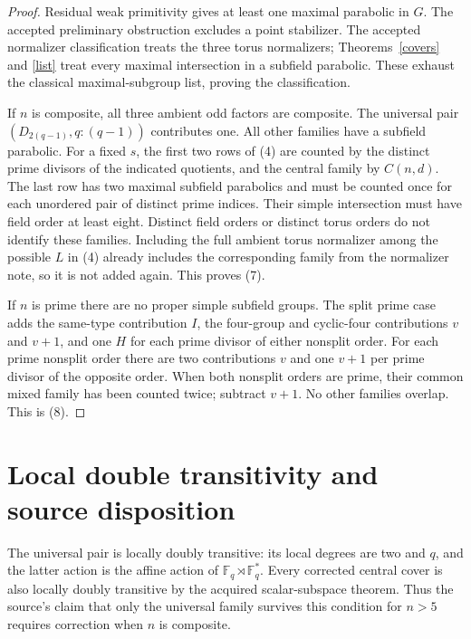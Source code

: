 \documentclass[11pt,a4paper]{article}
\newcommand{\F}{\mathbb F}
\begin{document}
\begin{proof}
Residual weak primitivity gives at least one maximal parabolic
in $G$. The accepted preliminary obstruction excludes a point
stabilizer. The accepted normalizer classification treats the
three torus normalizers; Theorems~\ref{covers} and \ref{list}
treat every maximal intersection in a subfield parabolic.
These exhaust the classical maximal-subgroup list, proving the
classification.

If $n$ is composite, all three ambient odd factors are composite.
The universal pair $(D_{2(q-1)},q\!:\!(q-1))$ contributes one.
All other families have a subfield parabolic. For a fixed $s$,
the first two rows of (4) are counted by the distinct prime
divisors of the indicated quotients, and the central family by
$C(n,d)$. The last row has two maximal subfield parabolics and
must be counted once for each unordered pair of distinct prime
indices. Their simple intersection must have field order at
least eight. Distinct field orders or distinct torus orders do
not identify these families. Including the full ambient torus
normalizer among the possible $L$ in (4) already includes the
corresponding family from the normalizer note, so it is not
added again. This proves (7).

If $n$ is prime there are no proper simple subfield groups.
The split prime case adds the same-type contribution $I$,
the four-group and cyclic-four contributions $v$ and $v+1$,
and one $H$ for each prime divisor of either nonsplit order.
For each prime nonsplit order there are two contributions $v$
and one $v+1$ per prime divisor of the opposite order. When
both nonsplit orders are prime, their common mixed family has
been counted twice; subtract $v+1$. No other families overlap.
This is (8).
\end{proof}

\section{Local double transitivity and source disposition}
The universal pair is locally doubly transitive: its local degrees
are two and $q$, and the latter action is the affine action of
$\F_q\rtimes\F_q^*$. Every corrected central cover is also
locally doubly transitive by the acquired scalar-subspace theorem.
Thus the source's claim that only the universal family survives
this condition for $n>5$ requires correction when $n$ is composite.
\end{document}
